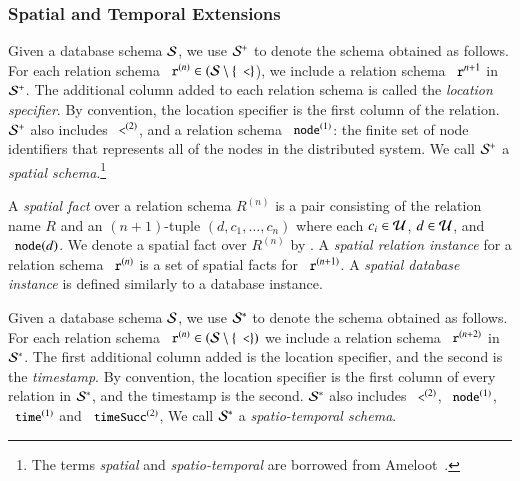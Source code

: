 

\subsubsection{Spatial and Temporal Extensions}
\label{sec:st}

Given a database schema $\schema$, we use $\sschema$ to denote the schema obtained
as follows. For each relation schema $\dedalus{r}^{(n)} \in (\schema \setminus \{\dedalus{<}\}$), we include a relation schema $\dedalus{r}^{n+1}$ in $\sschema$. The
additional column added to each relation schema is called the {\em location specifier}. By convention, the
location specifier is the first column of the relation.
$\sschema$ also includes $\dedalus{<}^{(2)}$, and a relation schema $\dedalus{node}^{(1)}$: the finite set of node identifiers that represents all of the nodes in the distributed system.
We call $\sschema$ a {\em spatial schema}.\footnote{The terms {\em spatial} and
  {\em spatio-temporal} are borrowed from Ameloot~\cite{ameloot-personal}.}

A {\em spatial fact} over a relation schema $R^{(n)}$ is a pair consisting of the relation name $R$ and an $(n+1)$-tuple $(d,c_1,\ldots,c_n)$ where each $c_i \in \univ$, $d \in \univ$, and $\dedalus{node}(d)$.  We denote a spatial fact over $R^{(n)}$ by .
A {\em spatial relation instance} for a relation schema $\dedalus{r}^{(n)}$ is a set of spatial facts for $\dedalus{r}^{(n+1)}$.
A {\em spatial database instance} is defined similarly to a database instance.

Given a database schema $\schema$, we use $\stschema$ to denote the schema obtained 
as follows. For each relation schema $\dedalus{r}^{(n)} \in (\schema \setminus \{\dedalus{<}\})$ we include a relation schema $\dedalus{r}^{(n+2)}$ in $\stschema$.  The first additional column added is the location specifier, and the second is the {\em timestamp}.  By convention, the location specifier is the first column of every relation in $\stschema$, and the timestamp is the second.  $\stschema$ also includes $\dedalus{<}^{(2)}$, $\dedalus{node}^{(1)}$, $\dedalus{time}^{(1)}$ and $\dedalus{timeSucc}^{(2)}$,   We call $\stschema$ a {\em spatio-temporal schema}.

